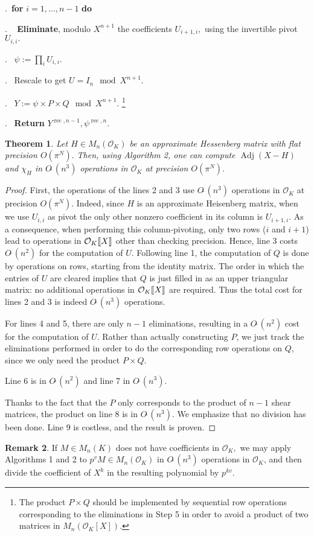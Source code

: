 \documentclass[sigconf]{acmart}
\DeclareMathOperator{\adj}{Adj}
\DeclareMathOperator{\rec}{rec}
\newcommand{\OK}{\mathcal{O}_K}
\newcommand{\llb}{[\mkern-2.5mu[}
\newcommand{\rrb}{]\mkern-2.5mu]}
\newcommand{\softO}{O\tilde{~}}
\newtheorem{theo}{Theorem}[section]
\theoremstyle{definition}
\newtheorem{rem}[theo]{Remark}
\begin{document}
.\    {\bf for} $i=1,\dots,n-1$ {\bf do} 

. \  \:  \textbf{Eliminate}, modulo $X^{n+1}$ the coefficients $U_{i+1,i},$
using the invertible pivot $U_{i,i}.$

. \ $\psi:=\prod_i U_{i,i}.$

. \ Rescale to get $U = I_n \mod X^{n+1}.$

. \ $Y:=\psi \times P \times Q   \mod X^{n+1}.$ \footnote{The product $P \times Q$
should be implemented by sequential row operations corresponding to the eliminations in Step 5
in order to avoid a product of two matrices in $M_n(\OK[X])$.}

. \ \textbf{Return} $Y^{\rec,n-1}, \psi^{\rec,n}.$

\vspace{-1ex}\noindent\hrulefill

\medskip

\begin{theo}
Let $H \in M_n(\OK)$ be an approximate Hessenberg matrix with
flat precision $O(\pi^N).$
Then, using Algorithm 2, one can compute $\adj (X{-}H)$
and $\chi_H$ in 
$\softO (n^3)$ operations in $\OK$ at precision $O(\pi^N).$
\end{theo}
\begin{proof}
First, the operations of the lines 2 and 3 use $\softO (n^3)$ operations
in $\OK$ at precision $O(\pi^N).$
Indeed, since $H$ is an approximate Heisenberg matrix, when we use $U_{i,i}$ as pivot
the only other nonzero coefficient in its column is $U_{i+1,i}$.
As a consequence, when performing this column-pivoting, only two rows ($i$ and
$i+1$) lead to operations in $\OK \llb X \rrb$ other than checking precision.
Hence, line 3 costs $\softO (n^2)$ for the computation of $U.$
Following line 1, the computation of $Q$ is done by operations on rows, starting from the identity matrix.
The order in which the entries of $U$ are cleared implies that $Q$ is just filled in as an upper triangular matrix:
no additional operations in $\OK\llb X\rrb$ are required. Thus the total cost
for lines 2 and 3 is indeed $\softO (n^3)$ operations.

For lines 4 and 5, there are only $n{-}1$ eliminations, resulting in a $\softO (n^2)$ cost
for the computation of $U.$ Rather than actually constructing $P$, we just track the eliminations
performed in order to do the corresponding row operations on $Q$, since we only need the product $P \times Q$.

Line 6 is in $\softO (n^2)$ and line 7 in $\softO (n^3).$

Thanks to the fact that the $P$ only corresponds to the product of $n{-}1$ 
shear matrices, the
product on line 8 is in $\softO (n^3).$
We emphasize that no division has been done.
Line 9 is costless, and the result is proven.
\end{proof}
\begin{rem}
If $M \in M_n(K)$ does not have coefficients in $\OK,$
we may apply Algorithms 1 and 2 to $p^v M \in M_n(\OK)$
in $\softO (n^3)$ operations in $\OK$, and then divide
the coefficient of $X^k$ in the resulting polynomial by $p^{kv}$.
\end{rem}
\end{document}

